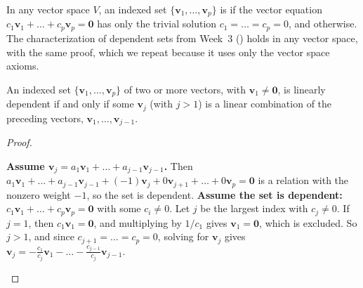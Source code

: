 \documentclass[10pt]{scrartcl}
\newcommand{\vv}[1]{\mathbf{#1}}
\begin{document}
In any vector space $V$, an indexed set $\{\vv v_1,\dots,\vv v_p\}$ is  if the vector equation $c_1\vv v_1+\dots+c_p\vv v_p=\vv 0$ has only the trivial solution $c_1=\dots=c_p=0$, and  otherwise. The characterization of dependent sets from Week~3 () holds in any vector space, with the same proof, which we repeat because it uses only the vector space axioms.

\begin{theorem*}
  An indexed set $\{\vv v_1,\dots,\vv v_p\}$ of two or more vectors, with $\vv v_1\ne\vv 0$, is linearly dependent if and only if some $\vv v_j$ (with $j>1$) is a linear combination of the preceding vectors, $\vv v_1,\dots,\vv v_{j-1}$.
\end{theorem*}
\begin{proof}
  \begin{steps}
    \ii \textbf{Assume $\vv v_j=a_1\vv v_1+\dots+a_{j-1}\vv v_{j-1}$.} Then $a_1\vv v_1+\dots+a_{j-1}\vv v_{j-1}+(-1)\vv v_j+0\vv v_{j+1}+\dots+0\vv v_p=\vv 0$ is a relation with the nonzero weight $-1$, so the set is dependent.
    \ii \textbf{Assume the set is dependent:} $c_1\vv v_1+\dots+c_p\vv v_p=\vv 0$ with some $c_i\ne0$. Let $j$ be the largest index with $c_j\ne0$. If $j=1$, then $c_1\vv v_1=\vv 0$, and multiplying by $1/c_1$ gives $\vv v_1=\vv 0$, which is excluded. So $j>1$, and since $c_{j+1}=\dots=c_p=0$, solving for $\vv v_j$ gives $\vv v_j=-\tfrac{c_1}{c_j}\vv v_1-\dots-\tfrac{c_{j-1}}{c_j}\vv v_{j-1}$.
  \end{steps}
\end{proof}
\end{document}
